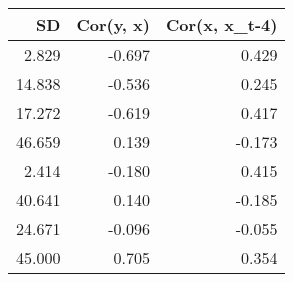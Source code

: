 \begin{tabular}{rrr}
\toprule
SD & Cor(y, x) & Cor(x, x_t-4) \\
\midrule
2.829 & -0.697 & 0.429 \\
14.838 & -0.536 & 0.245 \\
17.272 & -0.619 & 0.417 \\
46.659 & 0.139 & -0.173 \\
2.414 & -0.180 & 0.415 \\
40.641 & 0.140 & -0.185 \\
24.671 & -0.096 & -0.055 \\
45.000 & 0.705 & 0.354 \\
\bottomrule
\end{tabular}
